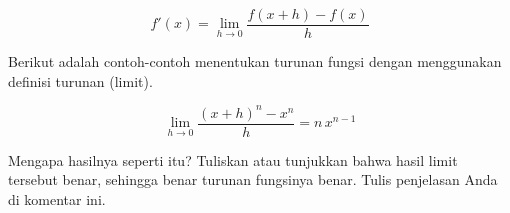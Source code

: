 \documentclass{article}
\begin{document}
\begin{eulernotebook}
\begin{eulercomment}
\begin{eulercomment}
\begin{eulercomment}
\end{eulercomment}
\begin{eulerformula}
\[
f'(x) = \lim_{h\to 0} \frac{f(x+h)-f(x)}{h}
\]
\end{eulerformula}
\begin{eulercomment}
Berikut adalah contoh-contoh menentukan turunan fungsi dengan
menggunakan definisi turunan (limit).
\end{eulercomment}
\begin{eulerformula}
\[
\lim_{h\rightarrow 0}{\frac{\left(x+h\right)^{n}-x^{n}}{h}}=n\,x^{n
 -1}
\]
\end{eulerformula}
\begin{eulercomment}
Mengapa hasilnya seperti itu? Tuliskan atau tunjukkan bahwa hasil
limit tersebut benar, sehingga benar turunan fungsinya benar.  Tulis
penjelasan Anda di komentar ini.


\end{eulercomment}
\end{eulercomment}
\end{eulercomment}
\end{eulernotebook}
\end{document}
